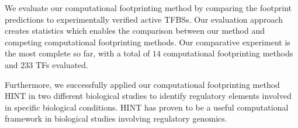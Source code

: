 We evaluate our computational footprinting method by comparing the footprint predictions to experimentally verified active TFBSs. Our evaluation approach creates statistics which enables the comparison between our method and competing computational footprinting methods. Our comparative experiment is the most complete so far, with a total of $14$ computational footprinting methods and $233$ TFs evaluated.

Furthermore, we successfully applied our computational footprinting method HINT in two different biological studies to identify regulatory elements involved in specific biological conditions. HINT has proven to be a useful computational framework in biological studies involving regulatory genomics.


